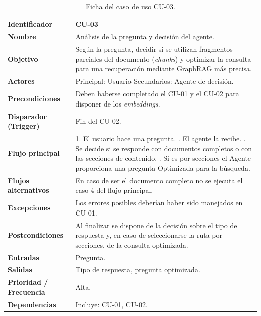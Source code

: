 \begin{table}[H]
\centering
\renewcommand{\arraystretch}{1.3} %
\begin{tabularx}{\textwidth}{|l|X|}
\hline
\textbf{Identificador} & CU-03 \\
\hline
\textbf{Nombre} & Análisis de la pregunta y decisión del agente. \\
\hline
\textbf{Objetivo} & Según la pregunta, decidir si se utilizan fragmentos parciales del documento (\textit{chunks}) y optimizar la consulta para una recuperación mediante GraphRAG más precisa. \\
\hline
\textbf{Actores} & Principal: Usuario \newline Secundarios: Agente de decisión. \\
\hline
\textbf{Precondiciones} & Deben haberse completado el CU-01 y el CU-02 para disponer de los \textit{embeddings}. \\
\hline
\textbf{Disparador (Trigger)} & Fin del CU-02. \\
\hline
\textbf{Flujo principal} &
1. El usuario hace una pregunta. \newline
2. El agente la recibe. \newline
3. Se decide si se responde con documentos completos o con las secciones de contenido. \newline
4. Si es por secciones el Agente proporciona una pregunta Optimizada para la búsqueda. \\
\hline
\textbf{Flujos alternativos} & En caso de ser el documento completo no se ejecuta el caso 4 del flujo principal. \\
\hline
\textbf{Excepciones} & Los errores posibles deberían haber sido manejados en CU-01. \\
\hline
\textbf{Postcondiciones} & Al finalizar se dispone de la decisión sobre el tipo de respuesta y, en caso de seleccionarse la ruta por secciones, de la consulta optimizada. \\
\hline
\textbf{Entradas} & Pregunta. \\
\hline
\textbf{Salidas} & Tipo de respuesta, pregunta optimizada. \\
\hline
\textbf{Prioridad / Frecuencia} & Alta. \\
\hline
\textbf{Dependencias} & Incluye: CU-01, CU-02. \\
\hline
\end{tabularx}
\caption{Ficha del caso de uso CU-03.}
\label{tab:CU-03}
\end{table}


